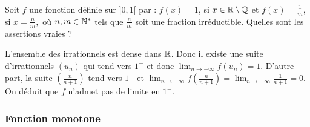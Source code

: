 \begin{question}

Soit  $f$ une fonction définie sur $]0,1[$ par :  
$f(x)=1$, si $x \in \mathbb{R} \setminus \mathbb{Q}$ et $f(x)=\frac{1}{m},$ si $x= \frac{n}{m},$ où  $n, m \in \mathbb{N}^*$ tels que $ \frac{n}{m}$ soit une fraction irréductible. Quelles sont les assertions vraies ?
\begin{answers}

    
    
    
    

\end{answers}
\begin{explanations}
L'ensemble des irrationnels est dense dans $\mathbb{R}$. Donc il existe une suite d'irrationnels $(u_n)$ qui tend vers $1^-$ et donc  $\lim_{n\to +\infty} f(u_n)=1$.  D'autre part, la suite $(\frac{n}{n+1})$  tend vers $1^-$ et $\lim_{n\to +\infty} f(\frac{n}{n+1})=\lim_{n\to +\infty} \frac{1}{n+1} = 0 $. On déduit que  $f$ n'admet pas de limite en $1^-$.
\end{explanations}

\end{question}



\subsubsection{Fonction monotone}

